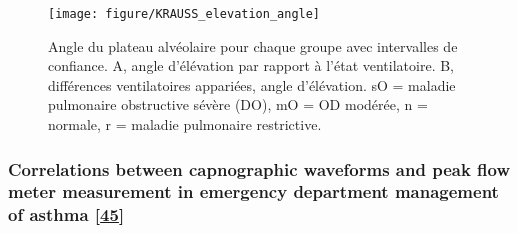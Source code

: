 \documentclass[12pt,]{article}
\begin{document}
\begin{figure}[h!]

{\centering \texttt{[image: figure/KRAUSS\_elevation\_angle]} 

}

\caption{Angle du plateau alvéolaire pour chaque groupe avec intervalles de confiance. A, angle d'élévation par rapport à l'état ventilatoire. B, différences ventilatoires appariées, angle d'élévation. sO = maladie pulmonaire obstructive sévère (DO), mO = OD modérée, n = normale, r = maladie pulmonaire restrictive.}\label{fig:unnamed-chunk-8}
\end{figure}

\hypertarget{correlations-between-capnographic-waveforms-and-peak-flow-meter-measurement-in-emergency-department-management-of-asthma-hisamuddin2009correlations}{%
\subsubsection{\texorpdfstring{Correlations between capnographic
waveforms and peak flow meter measurement in emergency department
management of asthma
{[}\protect\hyperlink{ref-hisamuddin2009correlations}{45}{]}}{Correlations between capnographic waveforms and peak flow meter measurement in emergency department management of asthma {[}45{]}}}\label{correlations-between-capnographic-waveforms-and-peak-flow-meter-measurement-in-emergency-department-management-of-asthma-hisamuddin2009correlations}}
\end{document}
